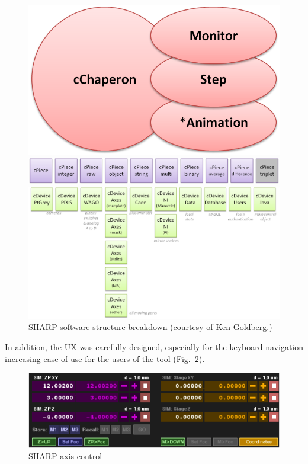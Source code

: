 \documentclass[10pt,letter,twoside]{report}
\begin{document}
			\begin{figure}[!ht]
			\centerline{\includegraphics[scale=0.5]{img/sharp-chaperon.png}}
			\centerline{\includegraphics[scale=0.3]{img/sharp-pieces.png}}
			\centerline{\includegraphics[scale=0.3]{img/sharp-objects.png}}
			\caption{SHARP software structure breakdown (courtesy of Ken Goldberg.)}
			\label{fig:sharp-breakdown}
			\end{figure}
			
			In addition, the UX was carefully designed, especially for the keyboard navigation increasing ease-of-use for the users of the tool 			(Fig.~\ref{fig:sharp-axis}).
			\begin{figure}[!ht]
			\centerline{\includegraphics[scale=0.5]{img/sharp-axis.png}}
			\caption{SHARP axis control}
			\label{fig:sharp-axis}
			\end{figure}
\end{document}
